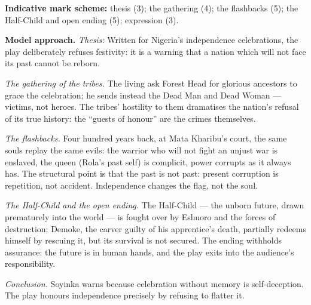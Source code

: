 \documentclass[11pt]{article}
\begin{document}
\begin{corrige}
\textbf{Indicative mark scheme:} thesis (3); the gathering (4); the flashbacks (5); the Half-Child and open ending (5); expression (3).

\textbf{Model approach.}
\emph{Thesis:} Written for Nigeria's independence celebrations, the play deliberately refuses festivity: it is a warning that a nation which will not face its past cannot be reborn.

\emph{The gathering of the tribes.} The living ask Forest Head for glorious ancestors to grace the celebration; he sends instead the Dead Man and Dead Woman --- victims, not heroes. The tribes' hostility to them dramatises the nation's refusal of its true history: the ``guests of honour'' are the crimes themselves.

\emph{The flashbacks.} Four hundred years back, at Mata Kharibu's court, the same souls replay the same evils: the warrior who will not fight an unjust war is enslaved, the queen (Rola's past self) is complicit, power corrupts as it always has. The structural point is that the past is not past: present corruption is repetition, not accident. Independence changes the flag, not the soul.

\emph{The Half-Child and the open ending.} The Half-Child --- the unborn future, drawn prematurely into the world --- is fought over by Eshuoro and the forces of destruction; Demoke, the carver guilty of his apprentice's death, partially redeems himself by rescuing it, but its survival is not secured. The ending withholds assurance: the future is in human hands, and the play exits into the audience's responsibility.

\emph{Conclusion.} Soyinka warns because celebration without memory is self-deception. The play honours independence precisely by refusing to flatter it.
\end{corrige}
\end{document}
